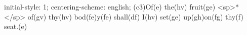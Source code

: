 initial-style: 1;
centering-scheme: english;
(c3)Of(e) the(hv) fruit(ge) <sp>*</sp> of(gv) thy(hv) bod(fe)y(fe) shall(df) I(hv) set(ge) up(gh)on(fg) thy(f) seat.(e)
